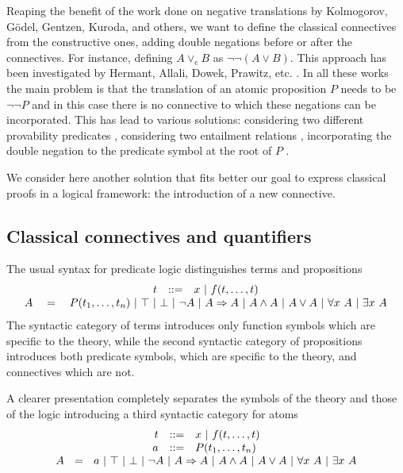 \documentclass[english]{lipics}
\newcommand\fa{\forall}
\newcommand\ex{\exists}
\begin{document}
Reaping the benefit of the work done on negative translations by
Kolmogorov, G\"odel, Gentzen, Kuroda, and others, we want to define
the classical connectives from the constructive ones, adding double
negations before or after the connectives. For instance, defining $A
\vee_{\mathrm c} B$ as $\neg \neg (A \vee B)$.  This approach has been
investigated by Hermant, Allali, Dowek, Prawitz, etc.
\cite{HermantAllali,Doweknotnot,Prawitz}. In all these
works the main problem is that the translation of an atomic
proposition $P$ needs to be $\neg \neg P$ and in this case there is no
connective to which these negations can be incorporated. This has lead to
various solutions: considering two different provability predicates
\cite{HermantAllali}, considering two entailment relations
\cite{Doweknotnot}, incorporating the double negation to the predicate
symbol at the root of $P$ \cite{Prawitz}.

We consider here another solution that fits better our goal to express
classical proofs in a logical framework: the introduction of a new
connective.

\subsection{Classical connectives and quantifiers}

The usual syntax for predicate logic distinguishes terms and propositions
$$
\begin{array}{c}
  \begin{array}{r@{~~~::=~~~}l}
    t & x~|~f(t,\ldots,t)
  \end{array}\\
  A~~~=~~~P(t_1, \ldots, t_n)~|~\top~|~\bot~|~\neg A~|~A \Rightarrow
  A~|~A \wedge A~|~A \vee A~|~\fa x~A~|~\ex x~A
\end{array}
$$
The syntactic category of terms introduces only function symbols which are
specific to the theory, while the second syntactic category of propositions
introduces both predicate symbols, which are specific to the theory, and
connectives which are not.

A clearer presentation completely separates the symbols of the theory
and those of the logic introducing a third syntactic category for atoms
$$
\begin{array}{c}
  \begin{array}{r@{~~~::=~~~}l}
  t & x~|~f(t,\ldots,t)\\
  a & P(t_1, \ldots, t_n)
  \end{array}\\
  A~~=~~a~|~\top~|~\bot~|~\neg A~|~A \Rightarrow A~|~A \wedge A~|~A \vee A
  ~|~\fa x~A~|~\ex x~A
\end{array}
$$
\end{document}
